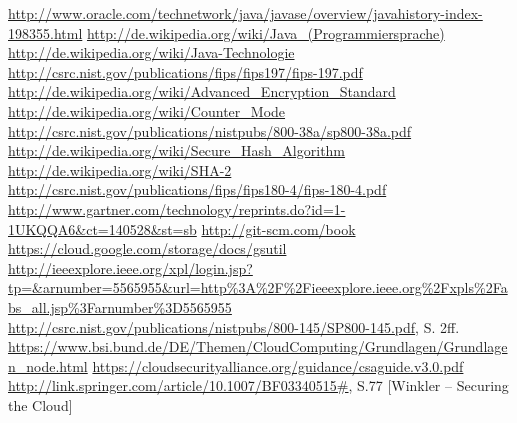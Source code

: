 \documentclass[12pt,a4paper,bibliography=totocnumbered,listof=totocnumbered]{scrartcl}
\begin{document}
 \begin{thebibliography}{xxxxxxxxxxxxxxxxxxx}
	\url{http://www.oracle.com/technetwork/java/javase/overview/javahistory-index-198355.html}
	\url{http://de.wikipedia.org/wiki/Java_(Programmiersprache)}
	\url{ http://de.wikipedia.org/wiki/Java-Technologie}
	\url{http://csrc.nist.gov/publications/fips/fips197/fips-197.pdf}
	\url{http://de.wikipedia.org/wiki/Advanced_Encryption_Standard}
	\url{http://de.wikipedia.org/wiki/Counter_Mode}
	\url{http://csrc.nist.gov/publications/nistpubs/800-38a/sp800-38a.pdf}
	\url{http://de.wikipedia.org/wiki/Secure_Hash_Algorithm}
	\url{http://de.wikipedia.org/wiki/SHA-2}
	\url{http://csrc.nist.gov/publications/fips/fips180-4/fips-180-4.pdf}
	\url{http://www.gartner.com/technology/reprints.do?id=1-1UKQQA6&ct=140528&st=sb}
 	\url{http://git-scm.com/book}
	\url{https://cloud.google.com/storage/docs/gsutil}	
	\url{http://ieeexplore.ieee.org/xpl/login.jsp?tp=&arnumber=5565955&url=http%3A%2F%2Fieeexplore.ieee.org%2Fxpls%2Fabs_all.jsp%3Farnumber%3D5565955}
	\url{http://csrc.nist.gov/publications/nistpubs/800-145/SP800-145.pdf}, S. 2ff.
	\url{https://www.bsi.bund.de/DE/Themen/CloudComputing/Grundlagen/Grundlagen_node.html}
	\url{https://cloudsecurityalliance.org/guidance/csaguide.v3.0.pdf}
	\url{http://link.springer.com/article/10.1007/BF03340515#},  S.77
	 [Winkler – Securing the Cloud]
	
\end{thebibliography}
\pagebreak

\setcounter{page}{1}
\end{document}
